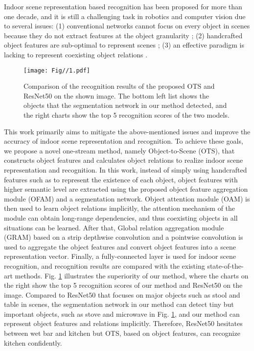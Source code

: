 \documentclass[letterpaper, 10 pt, conference]{ieeeconf}  %
\begin{document}
Indoor scene representation based recognition has been proposed for more than one decade, and it is still a challenging task in robotics and computer vision due to several issues: (1) conventional networks cannot focus on every object in scenes because they do not extract features at the object granularity \cite{He2016}; (2) handcrafted object features are sub-optimal to represent scenes \cite{Quelhas2005}; (3) an effective paradigm is lacking to represent coexisting object relations \cite{pal2019deduce}.


\begin{figure}[]
        \centering
        \texttt{[image: Fig//1.pdf]}
        \vspace{-1mm}
        \caption{Comparison of the recognition results of the proposed OTS and ResNet50 on the shown image. The bottom left list shows the objects that the segmentation network in our method detected, and the right charts show the top 5 recognition scores of the two models.}
        \vspace{-5mm}

        \label{img1}
\end{figure}

This work primarily aims to mitigate the above-mentioned issues and improve the accuracy of indoor scene representation and recognition. To achieve these goals, we propose a novel one-stream method, namely Object-to-Scene (OTS), that constructs object features and calculates object relations to realize indoor scene representation and recognition. In this work, instead of simply using handcrafted features such as \cite{pal2019deduce} to represent the existence of each object, object features with higher semantic level are extracted using the proposed object feature aggregation module (OFAM) and a segmentation network. Object attention module (OAM) is then used to learn object relations implicitly, the attention mechanism of the module can obtain long-range dependencies, and thus coexisting objects in all situations can be learned. After that, Global relation aggregation module (GRAM) based on a strip depthwise convolution and a pointwise convolution is used to aggregate the object features and convert object features into a scene representation vector. Finally, a fully-connected layer is used for indoor scene recognition, and recognition results are compared with the existing state-of-the-art methods. Fig. \ref{img1} illustrates the superiority of our method, where the charts on the right show the top 5 recognition scores of our method and ResNet50 on the image. Compared to ResNet50 that focuses on major objects such as stool and table in scenes, the segmentation network in our method can detect tiny but important objects, such as stove and microwave in Fig. \ref{img1}, and our method can represent object features and relations implicitly. Therefore, ResNet50 hesitates between wet bar and kitchen but OTS, based on object features, can recognize kitchen confidently.
\end{document}
